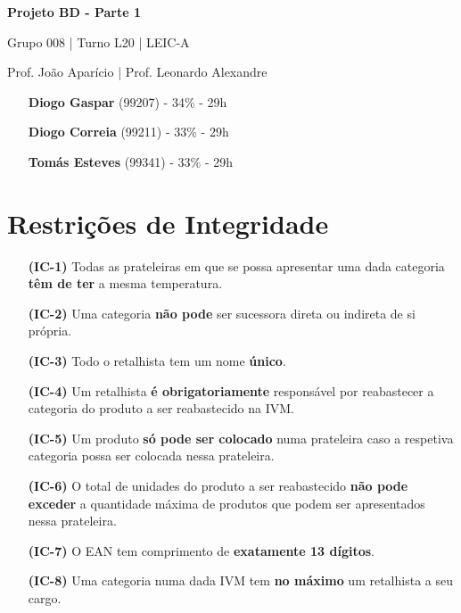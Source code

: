 \documentclass[12pt,a4paper]{article}
\begin{document}
  \begin{titlepage}
    \begin{center}
      \vspace*{5cm}
    
      \Huge
      \textbf{Projeto BD - Parte 1}

      \vspace{0.5cm}
      \LARGE
      Grupo 008 | Turno L20 | LEIC-A

      \vspace{0.5cm}
      \large
      Prof. João Aparício | Prof. Leonardo Alexandre

      \vfill
    \end{center}
    \large
    \begin{itemize}
      \item[] \textbf{Diogo Gaspar} (99207) - 34\% - 29h
      \item[] \textbf{Diogo Correia} (99211) - 33\% - 29h
      \item[] \textbf{Tomás Esteves} (99341) - 33\% - 29h
    \end{itemize}
  \end{titlepage}

  \begin{landscape}
    
  \end{landscape}

  \section*{Restrições de Integridade}
  \footnotesize
  \begin{itemize}
    \item[\textbf{(IC-1)}] Todas as prateleiras em que se possa apresentar uma dada categoria
      \textbf{têm de ter} a mesma temperatura.
		\item[\textbf{(IC-2)}] Uma categoria \textbf{não pode} ser sucessora direta
			ou indireta de si própria.
		\item[\textbf{(IC-3)}] Todo o retalhista tem um nome \textbf{único}.
		\item[\textbf{(IC-4)}] Um retalhista \textbf{é obrigatoriamente} responsável por
			reabastecer a categoria do produto a ser reabastecido na IVM.
		\item[\textbf{(IC-5)}] Um produto \textbf{só pode ser colocado} numa prateleira
			caso a respetiva categoria possa ser colocada nessa prateleira.
		\item[\textbf{(IC-6)}] O total de unidades do produto a ser reabastecido
			\textbf{não pode exceder} a quantidade máxima de produtos que podem ser apresentados nessa prateleira.
		\item[\textbf{(IC-7)}] O EAN tem comprimento de \textbf{exatamente 13 dígitos}.
		\item[\textbf{(IC-8)}] Uma categoria numa dada IVM tem \textbf{no máximo}
			um retalhista a seu cargo.
  \end{itemize}
\end{document}
